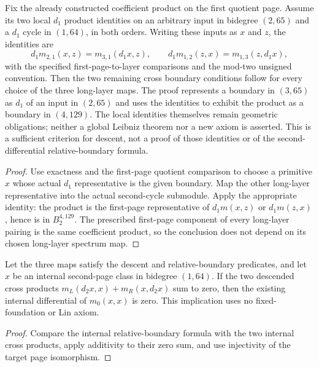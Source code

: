 \begin{proposition}
  \label{prop:h6-cross-boundary-from-first-differential}
  \leanok
  Fix the already constructed coefficient product on the first quotient
  page. Assume its two local $d_1$ product identities on an arbitrary
  input in bidegree $(2,65)$ and a $d_1$ cycle in $(1,64)$, in both
  orders. Writing these inputs as $x$ and $z$, the identities are
  \[
    d_1m_{2,1}(x,z)=m_{3,1}(d_1x,z),\qquad
    d_1m_{1,2}(z,x)=m_{1,3}(z,d_1x),
  \]
  with the specified first-page-to-layer comparisons and the mod-two
  unsigned convention. Then the two remaining cross boundary conditions follow for
  every choice of the three long-layer maps. The proof represents a
  boundary in $(3,65)$ as $d_1$ of an input in $(2,65)$ and uses the
  identities to exhibit the product as a boundary in $(4,129)$.
  The local identities themselves remain geometric obligations; neither
  a global Leibniz theorem nor a new axiom is asserted. This is a sufficient
  criterion for descent, not a proof of those identities or of the
  second-differential relative-boundary formula.
\end{proposition}
\begin{proof}
  Use exactness and the first-page quotient comparison to choose a
  primitive $x$ whose actual $d_1$ representative is the given boundary.
  Map the other long-layer representative into the actual second-cycle
  submodule. Apply the appropriate identity: the product is the first-page
  representative of $d_1m(x,z)$ or $d_1m(z,x)$, hence is in $B_2^{4,129}$.
  The prescribed first-page component of every long-layer pairing is the
  same coefficient product, so the conclusion does not depend on its
  chosen long-layer spectrum map.
  \leanok
\end{proof}

\begin{proposition}
  \label{prop:h6-long-layer-cross-cancellation}
  \leanok
  Let the three maps satisfy the descent and relative-boundary predicates,
  and let $x$ be an internal second-page class in bidegree $(1,64)$.
  If the two descended cross products $m_L(d_2x,x)+m_R(x,d_2x)$ sum to
  zero, then the existing internal differential of $m_0(x,x)$ is zero.
  This implication uses no fixed-foundation or Lin axiom.
\end{proposition}
\begin{proof}
  Compare the internal relative-boundary formula with the two internal
  cross products, apply additivity to their zero sum, and use injectivity
  of the target page isomorphism.
  \leanok
\end{proof}

